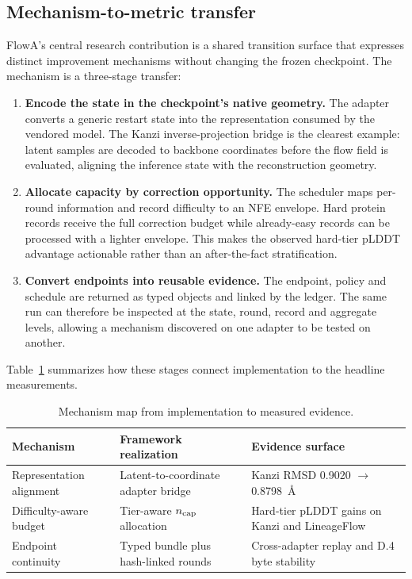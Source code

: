 \documentclass[journal,twocolumn,final]{IEEEtran}
\begin{document}
\subsection{Mechanism-to-metric transfer}
FlowA's central research contribution is a shared transition surface that expresses distinct improvement mechanisms without changing the frozen checkpoint. The mechanism is a three-stage transfer:
\begin{enumerate}
\setlength{\itemsep}{2pt}
\item \textbf{Encode the state in the checkpoint's native geometry.} The adapter converts a generic restart state into the representation consumed by the vendored model. The Kanzi inverse-projection bridge is the clearest example: latent samples are decoded to backbone coordinates before the flow field is evaluated, aligning the inference state with the reconstruction geometry.
\item \textbf{Allocate capacity by correction opportunity.} The scheduler maps per-round information and record difficulty to an NFE envelope. Hard protein records receive the full correction budget while already-easy records can be processed with a lighter envelope. This makes the observed hard-tier pLDDT advantage actionable rather than an after-the-fact stratification.
\item \textbf{Convert endpoints into reusable evidence.} The endpoint, policy and schedule are returned as typed objects and linked by the ledger. The same run can therefore be inspected at the state, round, record and aggregate levels, allowing a mechanism discovered on one adapter to be tested on another.
\end{enumerate}

Table~\ref{tab:mechanism-map} summarizes how these stages connect implementation to the headline measurements.
\begin{table}[t]
\centering\footnotesize
\setlength{\tabcolsep}{2pt}
\caption{Mechanism map from implementation to measured evidence.}
\label{tab:mechanism-map}
\begin{tabular}{p{}p{}p{}}
\toprule
Mechanism & Framework realization & Evidence surface \\
\midrule
Representation alignment & Latent-to-coordinate adapter bridge & Kanzi RMSD 0.9020 $\rightarrow$ 0.8798~\AA{} \\
Difficulty-aware budget & Tier-aware $n_{\rm cap}$ allocation & Hard-tier pLDDT gains on Kanzi and LineageFlow \\
Endpoint continuity & Typed bundle plus hash-linked rounds & Cross-adapter replay and D.4 byte stability \\
\bottomrule
\end{tabular}
\end{table}
\end{document}
